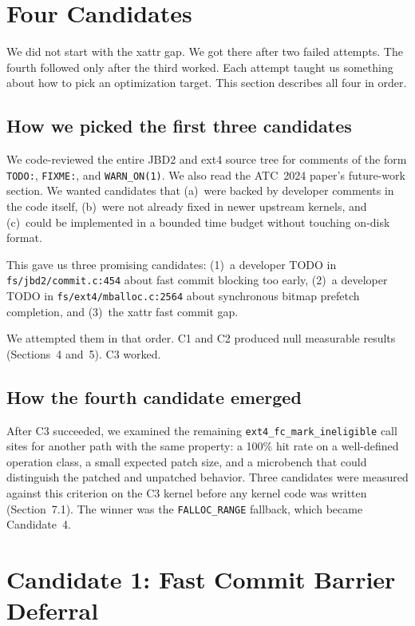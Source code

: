 \documentclass[11pt,a4paper]{article}
\begin{document}
\section{Four Candidates}

We did not start with the xattr gap. We got there after two failed
attempts. The fourth followed only after the third worked. Each
attempt taught us something about how to pick an optimization
target. This section describes all four in order.

\subsection{How we picked the first three candidates}

We code-reviewed the entire JBD2 and ext4 source tree for comments
of the form \texttt{TODO:}, \texttt{FIXME:}, and
\texttt{WARN\_ON(1)}. We also read the ATC~2024 paper's future-work
section. We wanted candidates that (a)~were backed by developer
comments in the code itself, (b)~were not already fixed in newer
upstream kernels, and (c)~could be implemented in a bounded time
budget without touching on-disk format.

This gave us three promising candidates: (1)~a developer TODO in
\texttt{fs/jbd2/commit.c:454} about fast commit blocking too early,
(2)~a developer TODO in \texttt{fs/ext4/mballoc.c:2564} about
synchronous bitmap prefetch completion, and (3)~the xattr fast
commit gap.

We attempted them in that order. C1 and C2 produced null measurable
results (Sections~4 and~5). C3 worked.

\subsection{How the fourth candidate emerged}

After C3 succeeded, we examined the remaining
\texttt{ext4\_fc\_mark\_ineligible} call sites for another path
with the same property: a 100\% hit rate on a well-defined
operation class, a small expected patch size, and a microbench
that could distinguish the patched and unpatched behavior. Three
candidates were measured against this criterion on the C3 kernel
before any kernel code was written (Section~7.1). The winner was
the \texttt{FALLOC\_RANGE} fallback, which became Candidate~4.

\section{Candidate 1: Fast Commit Barrier Deferral}
\end{document}
